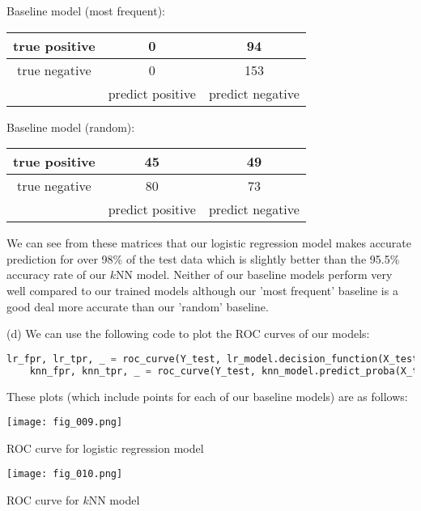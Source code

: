 \documentclass[12pt]{article}
\begin{document}
Baseline model (most frequent):

\begin{center}
    \begin{tabular}{c|c|c|}
        \hline
        true positive & 0 & 94 \\ \hline
        true negative & 0 & 153 \\ \hline
        & predict positive & predict negative \\
    \end{tabular}
\end{center}

Baseline model (random):

\begin{center}
    \begin{tabular}{c|c|c|}
        \hline
        true positive & 45 & 49 \\ \hline
        true negative & 80 & 73 \\ \hline
        & predict positive & predict negative \\
    \end{tabular}
\end{center}

We can see from these matrices that our logistic regression model makes accurate prediction for over 98\% of the test data which is slightly better than the 95.5\% accuracy rate of our $k$NN model. Neither of our baseline models perform very well compared to our trained models although our 'most frequent' baseline is a good deal more accurate than our 'random' baseline.

\noindent (d) We can use the following code to plot the ROC curves of our models:

\begin{center}
    \lstset{basicstyle=\footnotesize}
    \begin{lstlisting}[language=Python]
    lr_fpr, lr_tpr, _ = roc_curve(Y_test, lr_model.decision_function(X_test))
    knn_fpr, knn_tpr, _ = roc_curve(Y_test, knn_model.predict_proba(X_test)[:, 1])
    \end{lstlisting}
\end{center}

These plots (which include points for each of our baseline models) are as follows:

\begin{center}
    \texttt{[image: fig\_009.png]}
    
    ROC curve for logistic regression model
    
    \texttt{[image: fig\_010.png]}
    
    ROC curve for $k$NN model
\end{center}
\end{document}
